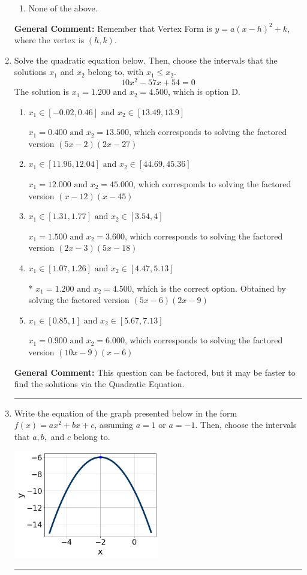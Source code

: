 \documentclass{extbook}[14pt]
\newcommand{\litem}[1]{\item #1

\rule{\textwidth}{0.4pt}}
\begin{document}
\begin{enumerate}
{\begin{enumerate}[label=\Alph*.]
\begin{multicols}{2}
\end{multicols}\item None of the above.\end{enumerate}
\textbf{General Comment:} Remember that Vertex Form is $y = a(x-h)^2+k$, where the vertex is $(h, k)$.
}
\litem{
Solve the quadratic equation below. Then, choose the intervals that the solutions $x_1$ and $x_2$ belong to, with $x_1 \leq x_2$.
\[ 10x^{2} -57 x + 54 = 0 \]The solution is \( x_1 = 1.200 \text{ and } x_2 = 4.500 \), which is option D.\begin{enumerate}[label=\Alph*.]
\item \( x_1 \in [-0.02, 0.46] \text{ and } x_2 \in [13.49, 13.9] \)

$x_1 = 0.400 \text{ and } x_2 = 13.500$, which corresponds to solving the factored version $(5x -2)(2x -27)$
\item \( x_1 \in [11.96, 12.04] \text{ and } x_2 \in [44.69, 45.36] \)

$x_1 = 12.000 \text{ and } x_2 = 45.000$, which corresponds to solving the factored version $(x -12)(x -45)$
\item \( x_1 \in [1.31, 1.77] \text{ and } x_2 \in [3.54, 4] \)

$x_1 = 1.500 \text{ and } x_2 = 3.600$, which corresponds to solving the factored version $(2x -3)(5x -18)$
\item \( x_1 \in [1.07, 1.26] \text{ and } x_2 \in [4.47, 5.13] \)

* $x_1 = 1.200 \text{ and } x_2 = 4.500$, which is the correct option. Obtained by solving the factored version $(5x -6)(2x -9)$
\item \( x_1 \in [0.85, 1] \text{ and } x_2 \in [5.67, 7.13] \)

$x_1 = 0.900 \text{ and } x_2 = 6.000$, which corresponds to solving the factored version $(10x -9)(x -6)$
\end{enumerate}

\textbf{General Comment:} This question can be factored, but it may be faster to find the solutions via the Quadratic Equation.
}
\litem{
Write the equation of the graph presented below in the form $f(x)=ax^2+bx+c$, assuming  $a=1$ or $a=-1$. Then, choose the intervals that $a, b,$ and $c$ belong to.

\begin{center}
    \includegraphics[width=0.5\textwidth]{../Figures/quadraticGraphToEquationB.png}
\end{center}


}
\end{enumerate}
\end{document}
